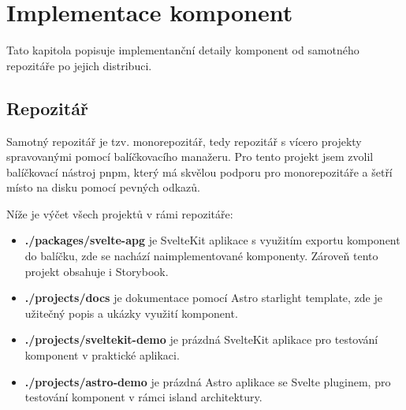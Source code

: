 \chapter{Implementace komponent}

Tato kapitola popisuje implementanční detaily komponent od samotného repozitáře po jejich distribuci.

\section{Repozitář}

Samotný repozitář je tzv. monorepozitář, tedy repozitář s vícero projekty spravovanými pomocí balíčkovacího manažeru.
Pro tento projekt jsem zvolil balíčkovací nástroj pnpm, který má skvělou podporu pro monorepozitáře a šetří místo na disku pomocí pevných odkazů.

Níže je výčet všech projektů v rámi repozitáře:


\begin{itemize}
    \item \textbf{./packages/svelte-apg} je SvelteKit aplikace s využitím exportu komponent do balíčku, zde se nachází naimplementované komponenty. Zároveň tento projekt obsahuje i Storybook.
    \item \textbf{./projects/docs} je dokumentace pomocí Astro starlight template, zde je užitečný popis a ukázky využití komponent.
    \item \textbf{./projects/sveltekit-demo} je prázdná SvelteKit aplikace pro testování komponent v praktické aplikaci.
    \item \textbf{./projects/astro-demo} je prázdná Astro aplikace se Svelte pluginem, pro testování komponent v rámci island architektury.
\end{itemize}




